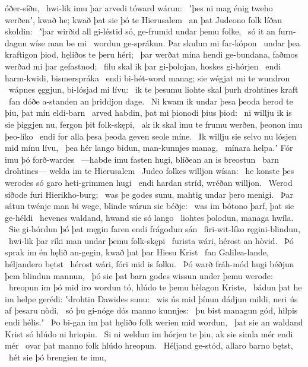 óðer-síðu, \hld\ hwi-lik imu þar arvedi
tóward wárun: \hld\ ʽþes ni mag énig tweho werðenʼ, kwað he;
kwað þat sie þó te Hierusalem \hld\ an þat Judeono folk
líðan skoldin: \hld\ ʽþar wirðid all gi-léstid só,
ge-frumid undar þemu folke, \hld\ só it an furn-dagun
wíse man be mi \hld\ wordun ge-sprákun.
Þar skulun mi far-kópon \hld\ undar þea kraftigon þiod,
hęliðos te þeru héri; \hld\ þar werðat mína hendi ge-bundana,
faðmos werðad mi þar gefastnod; \hld\ filu skal ik þar gi-þolojan,
hoskes gi-hórjen \hld\ endi harm-kwidi,
bismerspráka \hld\ endi bi-hét-word manag;
sie wégjat mi te wundron \hld\ wápnes ęggjun,
bi-lósjad mi lívu: \hld\ ik te þesumu liohte skal
þurh drohtines kraft \hld\ fan dóðe a-standen
an þriddjon dage. \hld\ Ni kwam ik undar þesa þeoda herod
te þiu, þat mín eldi-barn \hld\ arved habdin,
þat mi þionodi þius þiod: \hld\ ni willju ik is sie þiggjen nu,
fergon þit folk-skępi, \hld\ ak ik skal imu te frumu werðen,
þeonon imu þeo-líko \hld\ endi for alla þesa þeoda geven
seole míne. \hld\ Ik willju sie selvo nu
lósjen mid mínu lívu, \hld\ þea hér lango bidun,
man-kunnjes manag, \hld\ mínara helpa.ʼ
Fór imu þó forð-wardes \hld\ —habde imu fasten hugi,
blíðean an is breostun \hld\ barn drohtines—
welda im te Hierusalem \hld\ Judeo folkes
willjon wísan: \hld\ he konste þes werodes só garo
heti-grimmen hugi \hld\ endi hardan stríd,
wréðan willjon. \hld\ Werod síðode
furi Hierikho-burg; \hld\ was þe godes sunu,
mahtig undar þero menigi. \hld\ Þar sátun twénje man bi wege,
blinde wárun sie béðje: \hld\ was im bótono þarf,
þat sie ge-héldi \hld\ hevenes waldand,
hwand sie só lango \hld\ liohtes þolodun,
managa hwíla. \hld\ Sie gi-hórdun þó þat męgin faren
endi frágodun sán \hld\ firi-wit-líko
ręgini-blindun, \hld\ hwi-lik þar ríki man
undar þemu folk-skępi \hld\ furista wári,
hérost an hòvid. \hld\ Þó sprak im én hęlið an-gegin,
kwað þat þar Hiesu Krist \hld\ fan Galilea-lande,
héljandero bętst \hld\ hérost wári,
fóri mid is folku. \hld\ Þó warð fráh-mód hugi
béðjun þem blindun mannun, \hld\ þó sie þat barn godes
wissun under þemu werode: \hld\ hreopun im þó mid iro wordun tó,
hlúdo te þemu hèlagon Kriste, \hld\ bádun þat he im helpe gerédi:
ʽdrohtin Dawides sunu: \hld\ wis ús mid þínun dádjun mildi,
neri ús af þesaru nòdi, \hld\ só þu gi-nóge dós
manno kunnjes: \hld\ þu bist managun gód,
hilpis endi hélis.ʼ \hld\ Þo bi-gan im þat hęliðo folk
werien mid wordun, \hld\ þat sie an waldand Krist
só hlúdo ni hriopin. \hld\ Si ni weldun im hórjen te þiu,
ak sie simla mér endi mér \hld\ ovar þat manno folk
hlúdo hreopun. \hld\ Héljand ge-stód,
allaro barno bętst, \hld\ hét sie þó brengien te imu,
